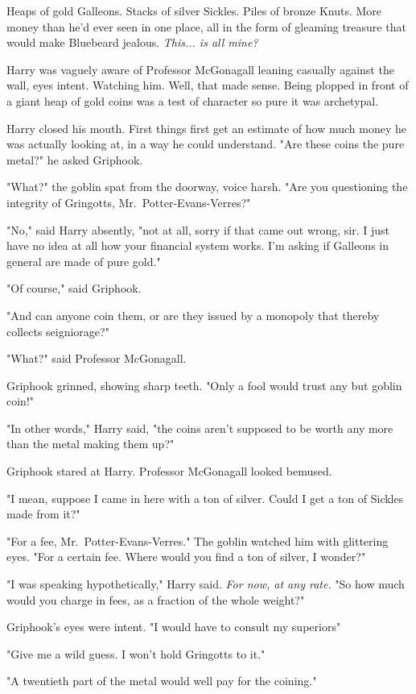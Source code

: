 Heaps of gold Galleons. Stacks of silver Sickles. Piles of
bronze Knuts. More money than he'd ever seen in one
place, all in the form of gleaming treasure that would make
Bluebeard jealous. \emph{This... is all mine?}

Harry was vaguely aware of Professor McGonagall leaning
casually against the wall, eyes intent. Watching him. Well, that made
sense. Being plopped in front of a giant heap of gold coins was a test of
character so pure it was archetypal.

Harry closed his mouth. First things first{\el} get an estimate
of how much money he was actually looking at, in a way
he could understand. "Are these coins the pure metal?" he asked Griphook.

"What?" the goblin spat from the doorway, voice harsh. "Are you
questioning the integrity of Gringotts, Mr.~Potter-Evans-Verres?"

"No," said Harry absently, "not at all, sorry if that came out wrong, sir. I
just have no idea at all how your financial system works. I'm asking if
Galleons in general are made of pure gold."

"Of course," said Griphook.

"And can anyone coin them, or are they issued by a monopoly that thereby
collects seigniorage?"

"What?" said Professor McGonagall.

Griphook grinned, showing sharp teeth. "Only a fool would trust any but goblin
coin!"

"In other words," Harry said, "the coins aren't supposed to be worth any more
than the metal making them up?"

Griphook stared at Harry. Professor McGonagall looked bemused.

"I mean, suppose I came in here with a ton of silver. Could I get a ton of
Sickles made from it?"

"For a fee, Mr.~Potter-Evans-Verres." The goblin watched him with glittering
eyes. "For a certain fee. Where would you find a ton of silver, I wonder?"

"I was speaking hypothetically," Harry said. \emph{For now, at any rate.}
"So{\el} how much would you charge in fees, as a fraction of the whole
weight?"

Griphook's eyes were intent. "I would have to consult my superiors{\el}"

"Give me a wild guess. I won't hold Gringotts to it."

"A twentieth part of the metal would well pay for the coining."

